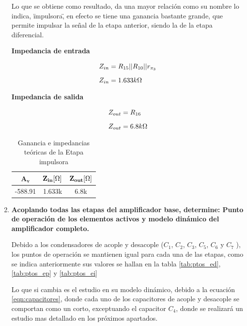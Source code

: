 \begin{enumerate}
        Lo que se obtiene como resultado, da una mayor relación como su nombre lo indica, \"impulsora\", en efecto se tiene una ganancia bastante grande, que permite impulsar la señal de la etapa anterior, siendo la de la etapa diferencial.

        \textbf{Impedancia de entrada}

        \begin{align*}
          Z_{in} & = R_{15}||R_{10}||r_{\pi_3} \\[0.2cm]
          Z_{in} & = 1.633k\ohm
        \end{align*}

        \textbf{Impedancia de salida}

        \begin{align*}
          Z_{out} & = R_{16}    \\[0.2cm]
          Z_{out} & = 6.8k \ohm
        \end{align*}

        \begin{table}[H]
          \centering
          \begin{tabular}{|c|c|c|}
            \hline
            $\mathbf{A_v}$ & $\mathbf{Z_{in}[\ohm]}$ & $\mathbf{Z_{out} [\ohm]}$ \\\hline
            -588.91        & 1.633k                  & 6.8k                      \\\hline
          \end{tabular}
          \caption{Ganancia e impedancias teóricas de la Etapa impulsora}
          \label{tab:dinamico_ei}
        \end{table}

  \item \textbf{Acoplando todas las etapas del amplificador base, determine: Punto de operación de los elementos activos
          y modelo dinámico del amplificador completo.}

        Debido a los condensadores de acople y desacople ($C_1$, $C_2$, $C_3$, $C_5$, $C_6$ y $C_7$ ), los puntos de operación se mantienen igual para cada una de las etapas, como se indica anteriormente sus valores se hallan en la tabla \ref{tab:ptos_ed}, \ref{tab:ptos_ep} y \ref{tab:ptos_ei}

        Lo que si cambia es el estudio en su modelo dinámico, debido a la ecuación \ref{eqn:capacitores}, donde cada uno de los capacitores de acople y desacople se comportan como un corto, exceptuando el capacitor $C_4$, donde se realizará un estudio mas detallado en los próximos apartados.



\end{enumerate}
